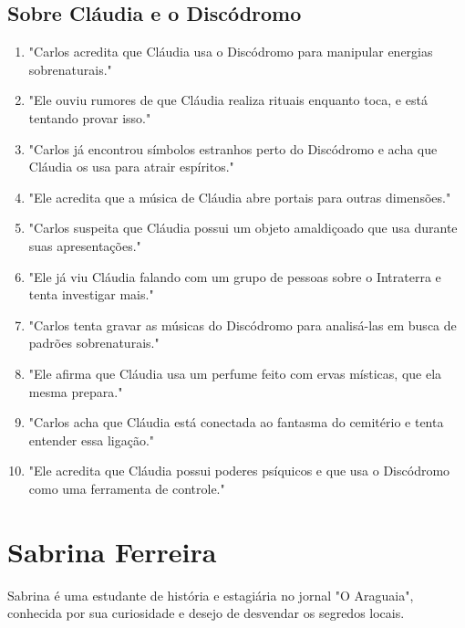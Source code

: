 \subsection*{Sobre Cláudia e o Discódromo}
\begin{enumerate}
    \item "Carlos acredita que Cláudia usa o Discódromo para manipular energias sobrenaturais."
    \item "Ele ouviu rumores de que Cláudia realiza rituais enquanto toca, e está tentando provar isso."
    \item "Carlos já encontrou símbolos estranhos perto do Discódromo e acha que Cláudia os usa para atrair espíritos."
    \item "Ele acredita que a música de Cláudia abre portais para outras dimensões."
    \item "Carlos suspeita que Cláudia possui um objeto amaldiçoado que usa durante suas apresentações."
    \item "Ele já viu Cláudia falando com um grupo de pessoas sobre o Intraterra e tenta investigar mais."
    \item "Carlos tenta gravar as músicas do Discódromo para analisá-las em busca de padrões sobrenaturais."
    \item "Ele afirma que Cláudia usa um perfume feito com ervas místicas, que ela mesma prepara."
    \item "Carlos acha que Cláudia está conectada ao fantasma do cemitério e tenta entender essa ligação."
    \item "Ele acredita que Cláudia possui poderes psíquicos e que usa o Discódromo como uma ferramenta de controle."
\end{enumerate}


\section{Sabrina Ferreira}
Sabrina é uma estudante de história e estagiária no jornal "O Araguaia", conhecida por sua curiosidade e desejo de desvendar os segredos locais.


